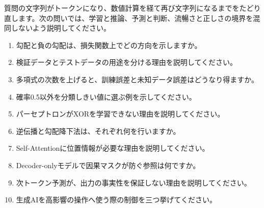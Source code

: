 質問の文字列がトークンになり、数値計算を経て再び文字列になるまでをたどり直します。次の問いでは、学習と推論、予測と判断、流暢さと正しさの境界を混同しないよう説明してください。

\begingroup
  \begin{enumerate}
    \item 勾配と負の勾配は、損失関数上でどの方向を示しますか。
    \item 検証データとテストデータの用途を分ける理由を説明してください。
    \item 多項式の次数を上げると、訓練誤差と未知データ誤差はどうなり得ますか。
    \item 確率0.5以外を分類しきい値に選ぶ例を示してください。
    \item パーセプトロンがXORを学習できない理由を説明してください。
    \item 逆伝播と勾配降下法は、それぞれ何を行いますか。
    \item Self-Attentionに位置情報が必要な理由を説明してください。
    \item Decoder-onlyモデルで因果マスクが防ぐ参照は何ですか。
    \item 次トークン予測が、出力の事実性を保証しない理由を説明してください。
    \item 生成AIを高影響の操作へ使う際の制御を三つ挙げてください。
  \end{enumerate}
\par
\endgroup


